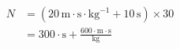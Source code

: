 \begin{align*}
    N &= \left(20 \, \text{m} \cdot \text{s} \cdot \text{kg}^{-1} + 10 \, \text{s}\right) \times 30 \\
    &= 300 \cdot \text{s} + \frac{600 \cdot \text{m} \cdot \text{s}}{\text{kg}}
\end{align*}